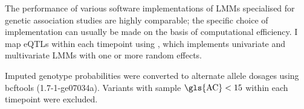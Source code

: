 %
The performance of various software implementations of \glspl{LMM} specialised for genetic association studies are highly comparable; 
the specific choice of implementation can usually be made on the basis of computational efficiency\autocite{eu-ahsunthornwattana2014ComparisonMethodsAccount}.
I map \glspl{eQTL} within each timepoint using \autocite{lippert2014LIMIXGeneticAnalysis}, which implements univariate and multivariate \glspl{LMM} with one or more random effects.

Imputed genotype probabilities were converted to alternate allele dosages using bcftools (1.7-1-ge07034a).
Variants with sample $\text{\gls{AC}} < 15$ within each timepoint were excluded.
%

